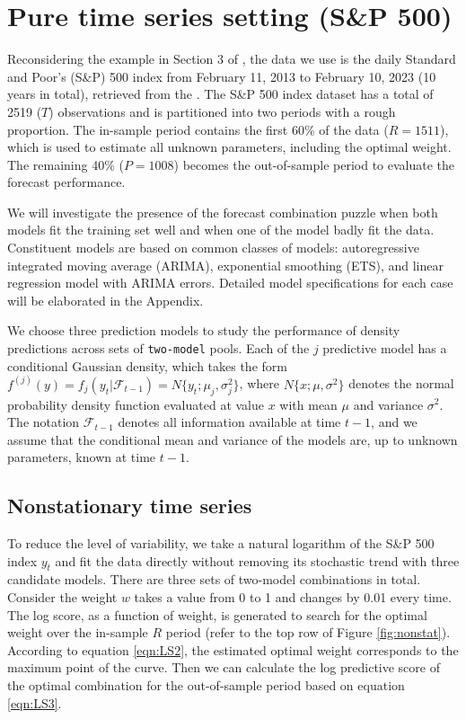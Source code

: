 \documentclass{monashthesis}
\begin{document}
\hypertarget{sp500}{%
\section{Pure time series setting (S\&P 500)}\label{sp500}}

Reconsidering the example in Section 3 of \textcite{GA11}, the data we use is the daily Standard and Poor's (S\&P) 500 index from February 11, 2013 to February 10, 2023 (10 years in total), retrieved from the \textcite{SP500}. The S\&P 500 index dataset has a total of 2519 (\(T\)) observations and is partitioned into two periods with a rough proportion. The in-sample period contains the first 60\% of the data (\(R = 1511\)), which is used to estimate all unknown parameters, including the optimal weight. The remaining 40\% (\(P = 1008\)) becomes the out-of-sample period to evaluate the forecast performance.

We will investigate the presence of the forecast combination puzzle when both models fit the training set well and when one of the model badly fit the data. Constituent models are based on common classes of models: autoregressive integrated moving average (ARIMA), exponential smoothing (ETS), and linear regression model with ARIMA errors. Detailed model specifications for each case will be elaborated in the Appendix.

We choose three prediction models to study the performance of density predictions across sets of \texttt{two-model} pools. Each of the \(j\) predictive model has a conditional Gaussian density, which takes the form \(f^{(j)}(y)=f_j(y_t|\mathcal{F}_{t-1})=N\{y_t; \mu_j, \sigma^2_j\}\), where \(N\{x; \mu, \sigma^2\}\) denotes the normal probability density function evaluated at value \(x\) with mean \(\mu\) and variance \(\sigma^2\). The notation \(\mathcal{F}_{t-1}\) denotes all information available at time \(t-1\), and we assume that the conditional mean and variance of the models are, up to unknown parameters, known at time \(t-1\).

\hypertarget{nonstationary-time-series}{%
\subsection{Nonstationary time series}\label{nonstationary-time-series}}

To reduce the level of variability, we take a natural logarithm of the S\&P 500 index \(y_t\) and fit the data directly without removing its stochastic trend with three candidate models. There are three sets of two-model combinations in total. Consider the weight \(w\) takes a value from 0 to 1 and changes by 0.01 every time. The log score, as a function of weight, is generated to search for the optimal weight over the in-sample \(R\) period (refer to the top row of Figure \ref{fig:nonstat}). According to equation \ref{eqn:LS2}, the estimated optimal weight corresponds to the maximum point of the curve. Then we can calculate the log predictive score of the optimal combination for the out-of-sample period based on equation \ref{eqn:LS3}.
\end{document}
